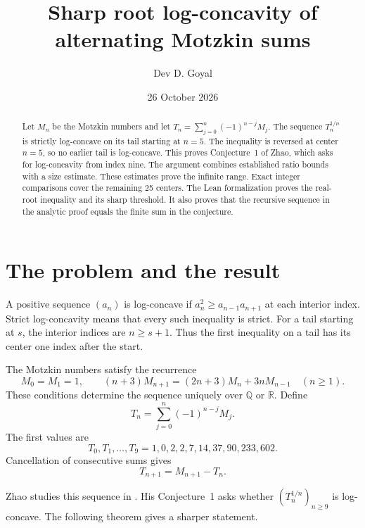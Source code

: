 \documentclass[11pt]{article}
\title{Sharp root log-concavity of alternating Motzkin sums}
\author{Dev D. Goyal}
\date{26 October 2026}
\begin{document}
\maketitle

\begin{abstract}
Let $M_n$ be the Motzkin numbers and let
$T_n=\sum_{j=0}^n(-1)^{n-j}M_j$.
The sequence $T_n^{1/n}$ is strictly log-concave on its tail
starting at $n=5$. The inequality is reversed at center $n=5$, so no earlier
tail is log-concave. This proves Conjecture~1 of Zhao, which asks for
log-concavity from index nine. The argument combines established ratio
bounds with a size estimate. These estimates prove the infinite range.
Exact integer comparisons cover the remaining 25 centers. The Lean
formalization proves the real-root inequality and its sharp threshold.
It also proves that the recursive sequence in the analytic proof equals
the finite sum in the conjecture.
\end{abstract}

\section{The problem and the result}

A positive sequence $(a_n)$ is log-concave if
$a_n^2\ge a_{n-1}a_{n+1}$ at each interior index.
Strict log-concavity means that every such inequality is strict.
For a tail starting at $s$, the interior indices are $n\ge s+1$.
Thus the first inequality on a tail has its center one index after the start.

The Motzkin numbers satisfy the recurrence
\begin{equation}\label{eq:motzkin}
M_0=M_1=1,\qquad
(n+3)M_{n+1}=(2n+3)M_n+3nM_{n-1}\quad(n\ge1).
\end{equation}
These conditions determine the sequence uniquely over $\mathbb Q$ or $\mathbb R$.
Define
\begin{equation}\label{eq:alternating}
T_n=\sum_{j=0}^{n}(-1)^{n-j}M_j.
\end{equation}
The first values are
\[
T_0,T_1,\ldots,T_9=1,0,2,2,7,14,37,90,233,602.
\]
Cancellation of consecutive sums gives
\begin{equation}\label{eq:Trec}
T_{n+1}=M_{n+1}-T_n.
\end{equation}

Zhao studies this sequence in \cite{Zhao}. His Conjecture~1 asks whether
$(T_n^{1/n})_{n\ge9}$ is log-concave. The following theorem gives a sharper statement.
\end{document}
